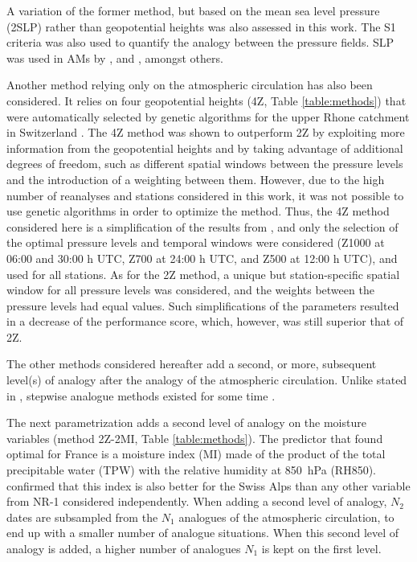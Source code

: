 \documentclass{ametsoc}
\begin{document}
A variation of the former method, but based on the mean sea level pressure (2SLP) rather than geopotential heights was also assessed in this work. The S1 criteria was also used to quantify the analogy between the pressure fields. SLP was used in AMs by \citet{Zorita1999}, \citet{Timbal2001a} and \citet{Martin2014b}, amongst others.

Another method relying only on the atmospheric circulation has also been considered. It relies on four geopotential heights (4Z, Table \ref{table:methods}) that were automatically selected by genetic algorithms for the upper Rhone catchment in Switzerland \citep{Horton2017b}. The 4Z method was shown to outperform 2Z by exploiting more information from the geopotential heights and by taking advantage of additional degrees of freedom, such as different spatial windows between the pressure levels and the introduction of a weighting between them. However, due to the high number of reanalyses and stations considered in this work, it was not possible to use genetic algorithms in order to optimize the method. Thus, the 4Z method considered here is a simplification of the results from \citet{Horton2017b}, and only the selection of the optimal pressure levels and temporal windows were considered (Z1000 at 06:00 and 30:00 h UTC, Z700 at 24:00 h UTC, and Z500 at 12:00 h UTC), and used for all stations. As for the 2Z method, a unique but station-specific spatial window for all pressure levels was considered, and the weights between the pressure levels had equal values. Such simplifications of the parameters resulted in a decrease of the performance score, which, however, was still superior that of 2Z.

The other methods considered hereafter add a second, or more, subsequent level(s) of analogy after the analogy of the atmospheric circulation. Unlike stated in \citet{Caillouet2016}, stepwise analogue methods existed for some time \citep[e.g.][]{Bontron2004, Bontron2005, Marty2010, Marty2012, Horton2012a}. 

The next parametrization adds a second level of analogy on the moisture variables (method 2Z-2MI, Table \ref{table:methods}). The predictor that \citet{Bontron2004} found optimal for France is a moisture index (MI) made of the product of the total precipitable water (TPW) with the relative humidity at 850~hPa (RH850). \cite{Horton2012a} confirmed that this index is also better for the Swiss Alps than any other variable from NR-1 considered independently. When adding a second level of analogy, $N_{2}$ dates are subsampled from the $N_{1}$ analogues of the atmospheric circulation, to end up with a smaller number of analogue situations. When this second level of analogy is added, a higher number of analogues $N_{1}$ is kept on the first level. 
\end{document}
